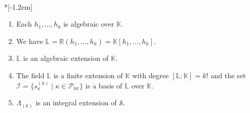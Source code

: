 \documentclass[ALCO,ThmDefs,Unicode,epreuves]{cedram}
\DeclareMathOperator{\irr}{irr}
\begin{document}
\begin{prop}\label{PropLK}\ \\*[-1.2em]

\begin{enumerate}
\item\label{prop4.2_1} Each $h_{1},\ldots,h_{k}$ is algebraic over $\mathbb{K}$.

\item\label{prop4.2_2} We have $\mathbb{L}=\mathbb{R}(h_{1},\ldots,h_{k})=\mathbb{K}%
[h_{1},\ldots,h_{k}]$.

\item\label{prop4.2_3} $\mathbb{L}$ is an algebraic extension of $\mathbb{K}$.

\item\label{prop4.2_4} The field $\mathbb{L}$ is a finite extension of $\mathbb{K}$ with degree
$[\mathbb{L}:\mathbb{K}]=k!$ and the set $\mathcal{I}=\{s_{\kappa}^{(k)}%
\mid\kappa\in\mathcal{P}_{\irr }\}$ is a basis of $\mathbb{L}$ over
$\mathbb{K}$.

\item\label{prop4.2_5} $\Lambda_{(k)}$ is an integral extension of $\mathbb{A}$.
\end{enumerate}
\end{prop}
\end{document}
